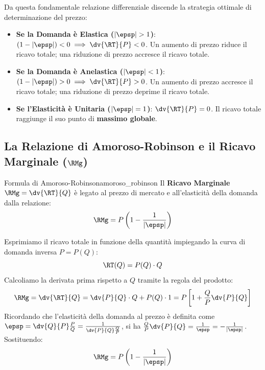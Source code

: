 Da questa fondamentale relazione differenziale discende la strategia ottimale di determinazione del prezzo:
\begin{itemize}
    \item \textbf{Se la Domanda è Elastica ($|\epsp| > 1$)}: $(1 - |\epsp|) < 0 \implies \dv{\RT}{P} < 0$.
    Un aumento di prezzo riduce il ricavo totale; una riduzione di prezzo accresce il ricavo totale.
    \item \textbf{Se la Domanda è Anelastica ($|\epsp| < 1$)}: $(1 - |\epsp|) > 0 \implies \dv{\RT}{P} > 0$.
    Un aumento di prezzo accresce il ricavo totale; una riduzione di prezzo deprime il ricavo totale.
    \item \textbf{Se l'Elasticità è Unitaria ($|\epsp| = 1$)}: $\dv{\RT}{P} = 0$.
    Il ricavo totale raggiunge il suo punto di \textbf{massimo globale}.
\end{itemize}

\subsection{La Relazione di Amoroso-Robinson e il Ricavo Marginale ($\RMg$)}

\begin{teorema}{Formula di Amoroso-Robinson}{amoroso_robinson}
Il \textbf{Ricavo Marginale} $\RMg = \dv{\RT}{Q}$ è legato al prezzo di mercato e all'elasticità della domanda dalla relazione:
\begin{equation}
    \RMg = P \left( 1 - \frac{1}{|\epsp|} \right)
\end{equation}
\end{teorema}

\begin{dimostrazione}
Esprimiamo il ricavo totale in funzione della quantità impiegando la curva di domanda inversa $P = P(Q)$:
\begin{equation}
    \RT(Q) = P(Q) \cdot Q
\end{equation}
Calcoliamo la derivata prima rispetto a $Q$ tramite la regola del prodotto:
\begin{equation}
    \RMg = \dv{\RT}{Q} = \dv{P}{Q} \cdot Q + P(Q) \cdot 1 = P \left[ 1 + \frac{Q}{P} \dv{P}{Q} \right]
\end{equation}
Ricordando che l'elasticità della domanda al prezzo è definita come $\epsp = \dv{Q}{P} \frac{P}{Q} = \frac{1}{\dv{P}{Q} \frac{Q}{P}}$, si ha $\frac{Q}{P} \dv{P}{Q} = \frac{1}{\epsp} = - \frac{1}{|\epsp|}$. Sostituendo:
\begin{equation}
    \RMg = P \left( 1 - \frac{1}{|\epsp|} \right)
\end{equation}
\end{dimostrazione}

